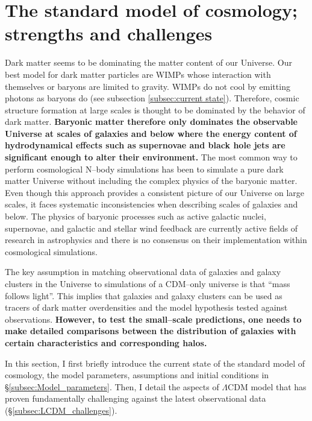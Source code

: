 \documentclass[paper=a4, fontsize=11pt]{scrartcl} %
\numberwithin{equation}{section} %
\numberwithin{figure}{section} %
\numberwithin{table}{section} %
\begin{document}
\section{The standard model of cosmology; strengths and challenges}
\label{sec:LCDM}
Dark matter seems to be dominating the matter content of our Universe. Our best model for dark matter particles are WIMPs whose interaction with themselves or baryons are limited to gravity.  WIMPs do not cool by emitting photons as baryons do (see subsection \ref{subsec:current state}). Therefore, cosmic structure formation at large scales is thought to be dominated by the behavior of dark matter. {\bf Baryonic matter therefore only dominates the observable Universe at scales of galaxies and below where the energy content of hydrodynamical effects such as supernovae and black hole jets are significant enough to alter their environment.} The most common way to perform cosmological N--body simulations has been to simulate a pure dark matter Universe without including the complex physics of the baryonic matter.  Even though this approach provides a consistent picture of our Universe on large scales, it faces systematic inconsistencies when describing scales of galaxies and below. The physics of baryonic processes such as active galactic nuclei, supernovae, and galactic and stellar wind feedback are currently active fields of research in astrophysics and there is no consensus on their implementation within cosmological simulations. 

The key assumption in matching observational data of galaxies and galaxy clusters in the Universe to simulations of a CDM--only universe is that ``mass follows light''. This implies that galaxies and galaxy clusters can be used as tracers of dark matter overdensities and the model hypothesis tested against observations. {\bf However, to test the small--scale predictions, one needs to make detailed comparisons between the distribution of galaxies with certain characteristics and corresponding halos.}  %

In this section, I first briefly introduce the current state of the standard model of cosmology, the model parameters, assumptions and initial conditions in  \S \ref{subsec:Model_parameters}. Then, I detail the aspects of $\Lambda$CDM model that has proven fundamentally challenging against the latest observational data (\S \ref{subsec:LCDM_challenges}).
\end{document}
